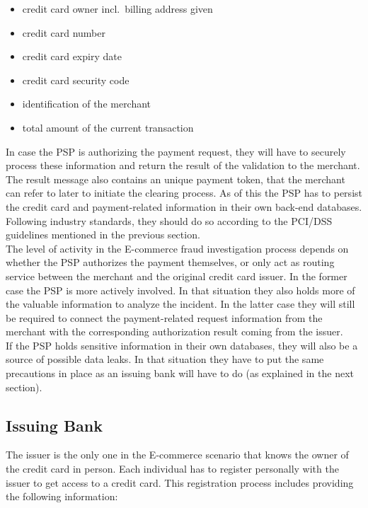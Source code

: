 \begin{itemize}
		\item credit card owner incl.\ billing address given
		\item credit card number
		\item credit card expiry date
		\item credit card security code
		\item identification of the merchant
		\item total amount of the current transaction
\end{itemize}

In case the \gls{PSP} is authorizing the payment request, they will have to securely process these information and return the result of the validation to the merchant. The result message also contains an unique payment token, that the merchant can refer to later to initiate the clearing process. As of this the \gls{PSP} has to persist the credit card and payment-related information in their own back-end databases. Following industry standards, they should do so according to the \gls{PCI/DSS} guidelines mentioned in the previous section. \\

The level of activity in the \gls{E-commerce} fraud investigation process depends on whether the \gls{PSP} authorizes the payment themselves, or only act as routing service between the merchant and the original credit card issuer. In the former case the \gls{PSP} is more actively involved. In that situation they also holds more of the valuable information to analyze the incident. In the latter case they will still be required to connect the payment-related request information from the merchant with the corresponding authorization result coming from the issuer. \\

If the \gls{PSP} holds sensitive information in their own databases, they will also be a source of possible data leaks. In that situation they have to put the same precautions in place as an issuing bank will have to do (as explained in the next section).


\subsection{Issuing Bank}
\label{subsec:stakeholder_issuer}

The issuer is the only one in the \gls{E-commerce} scenario that knows the owner of the credit card in person. Each individual has to register personally with the issuer to get access to a credit card. This registration process includes providing the following information: \@

